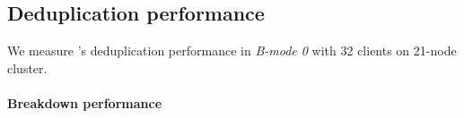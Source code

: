 \subsection{Deduplication performance}

We measure \sysname's deduplication performance in \emph{B-mode 0}
with 32 clients on 21-node cluster.


\paragraph{Breakdown performance}



